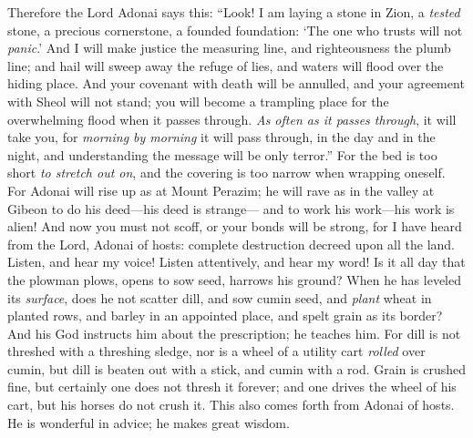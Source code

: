 \begin{biblechapter}
\verse Therefore the Lord Adonai says this: “Look! I am laying a stone in Zion, 
a \textit{tested} stone, 
a precious cornerstone, 
a founded foundation: ‘The one who trusts will not \textit{panic}.’
\verse And I will make justice the measuring line, 
and righteousness the plumb line; 
and hail will sweep away the refuge of lies, 
and waters will flood over the hiding place.
\verse And your covenant with death will be annulled, 
and your agreement with Sheol will not stand; 
you will become a trampling place for the overwhelming flood when it passes through.
\verse \textit{As often as it passes through}, it will take you, 
for \textit{morning by morning} it will pass through, 
in the day and in the night, and understanding the message will be only terror.”
\verse For the bed is too short \textit{to stretch out on}, 
and the covering is too narrow when wrapping oneself.
\verse For Adonai will rise up as at Mount Perazim; 
he will rave as in the valley at Gibeon 
to do his deed—his deed is strange— 
and to work his work—his work is alien!
\verse And now you must not scoff, 
or your bonds will be strong, for I have heard from the Lord, Adonai of hosts: complete destruction 
decreed upon all the land.
 Listen, and hear my voice! 
Listen attentively, and hear my word!
\verse Is it all day that the plowman plows, 
opens to sow seed, harrows his ground?
\verse When he has leveled its \textit{surface}, does he not scatter dill, 
and sow cumin seed, 
and \textit{plant} wheat in planted rows, 
and barley in an appointed place, 
and spelt grain as its border?
\verse And his God instructs him about the prescription; 
he teaches him.
\verse For dill is not threshed with a threshing sledge, 
nor is a wheel of a utility cart \textit{rolled} over cumin, 
but dill is beaten out with a stick, 
and cumin with a rod.
\verse Grain is crushed fine, 
but certainly one does not thresh it forever; 
and one drives the wheel of his cart, 
but his horses do not crush it.
\verse This also comes forth from Adonai of hosts. He is wonderful in advice; 
he makes great wisdom.
\end{biblechapter}

